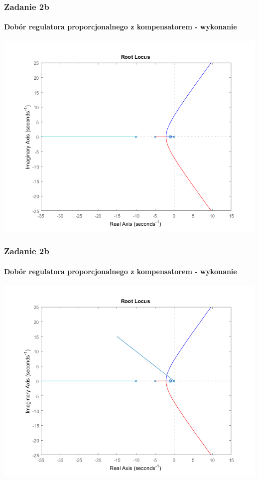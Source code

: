 \documentclass{beamer}
\begin{document}
\begin{frame}\frametitle{Zadanie 2b}\framesubtitle{Dobór regulatora proporcjonalnego z kompensatorem - wykonanie}
\centering	\includegraphics[scale=0.5]{b-rlocus-bez-linii.png}
\end{frame}

\begin{frame}\frametitle{Zadanie 2b}\framesubtitle{Dobór regulatora proporcjonalnego z kompensatorem - wykonanie}
\centering	\includegraphics[scale=0.5]{b-rlocus.png}
\end{frame}
\end{document}
